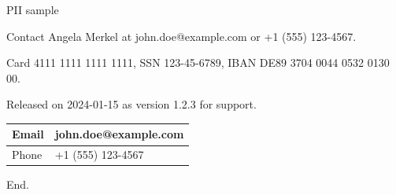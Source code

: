 \documentclass[11pt,a4paper]{article}
\begin{document}
PII sample

Contact Angela Merkel at john.doe@example.com or +1 (555) 123-4567.

Card 4111 1111 1111 1111, SSN 123-45-6789, IBAN DE89 3704 0044 0532 0130 00.

Released on 2024-01-15 as version 1.2.3 for support.

\begin{table}[h]
\begin{tabular}{|l|l|}
\hline
Email & john.doe@example.com \\ \hline
Phone & +1 (555) 123-4567 \\ \hline
\end{tabular}
\end{table}

End.
\end{document}
